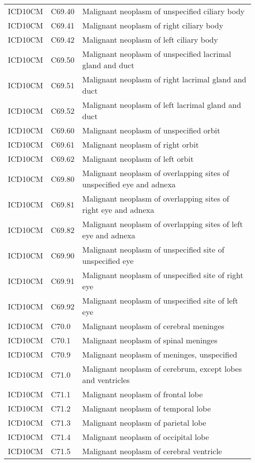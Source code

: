 \begin{longtable}{p{}p{}p{}}
  ICD10CM & C69.40 & Malignant neoplasm of unspecified ciliary body \\ 
  ICD10CM & C69.41 & Malignant neoplasm of right ciliary body \\ 
  ICD10CM & C69.42 & Malignant neoplasm of left ciliary body \\ 
  ICD10CM & C69.50 & Malignant neoplasm of unspecified lacrimal gland and duct \\ 
  ICD10CM & C69.51 & Malignant neoplasm of right lacrimal gland and duct \\ 
  ICD10CM & C69.52 & Malignant neoplasm of left lacrimal gland and duct \\ 
  ICD10CM & C69.60 & Malignant neoplasm of unspecified orbit \\ 
  ICD10CM & C69.61 & Malignant neoplasm of right orbit \\ 
  ICD10CM & C69.62 & Malignant neoplasm of left orbit \\ 
  ICD10CM & C69.80 & Malignant neoplasm of overlapping sites of unspecified eye and adnexa \\ 
  ICD10CM & C69.81 & Malignant neoplasm of overlapping sites of right eye and adnexa \\ 
  ICD10CM & C69.82 & Malignant neoplasm of overlapping sites of left eye and adnexa \\ 
  ICD10CM & C69.90 & Malignant neoplasm of unspecified site of unspecified eye \\ 
  ICD10CM & C69.91 & Malignant neoplasm of unspecified site of right eye \\ 
  ICD10CM & C69.92 & Malignant neoplasm of unspecified site of left eye \\ 
  ICD10CM & C70.0 & Malignant neoplasm of cerebral meninges \\ 
  ICD10CM & C70.1 & Malignant neoplasm of spinal meninges \\ 
  ICD10CM & C70.9 & Malignant neoplasm of meninges, unspecified \\ 
  ICD10CM & C71.0 & Malignant neoplasm of cerebrum, except lobes and ventricles \\ 
  ICD10CM & C71.1 & Malignant neoplasm of frontal lobe \\ 
  ICD10CM & C71.2 & Malignant neoplasm of temporal lobe \\ 
  ICD10CM & C71.3 & Malignant neoplasm of parietal lobe \\ 
  ICD10CM & C71.4 & Malignant neoplasm of occipital lobe \\ 
  ICD10CM & C71.5 & Malignant neoplasm of cerebral ventricle \\ 

\end{longtable}
